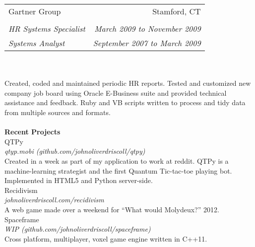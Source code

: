 \documentclass[11pt]{article}
\begin{document}
\noindent
\begin{tabular*}{\textwidth}{@{\extracolsep{\fill}}lr}
\large{Gartner Group} & Stamford, CT\\\\[-0.1in]
\textsl{HR Systems Specialist} &
\textsl{\small{March 2009 to November 2009}}\\
\textsl{Systems Analyst} &
\textsl{\small{September 2007 to March 2009}}\\
\end{tabular*}\\\\
{\small\noindent
Created, coded and maintained periodic HR reports.  Tested and customized new 
company job board using Oracle E-Business suite and provided technical
assistance and feedback.  Ruby and VB scripts written to process and tidy data
from multiple sources and formats.
}\\\\

\noindent
\large\textbf{Recent Projects}\\

\noindent
\large{QTPy}\\
\textsl{qtyp.mobi \footnotesize{(github.com/johnoliverdriscoll/qtpy)}}\\
{\small\noindent
Created in a week as part of my application to work at reddit.  QTPy is a 
machine-learning strategist and the first Quantum Tic-tac-toe playing bot. 
Implemented in HTML5 and Python server-side.
}\\

\noindent
\large{Recidivism}\\
\textsl{johnoliverdriscoll.com/recidivism}\\
{\small\noindent
A web game made over a weekend for ``What would Molydeux?'' 2012.
}\\

\noindent
\large{Spaceframe}\\
\textsl{WIP \footnotesize{(github.com/johnoliverdriscoll/spaceframe)}}\\
{\small\noindent
Cross platform, multiplayer, voxel game engine written in C++11.
}\\
\end{document}
